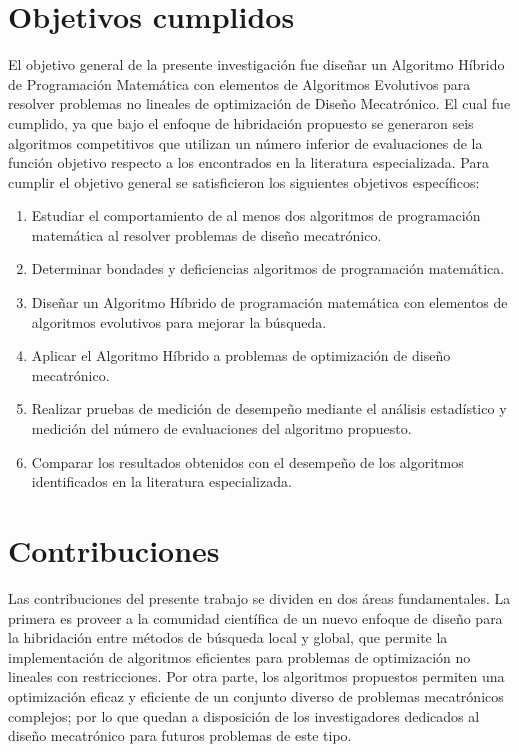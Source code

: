 	 \section{Objetivos cumplidos}
	  El objetivo general de la presente investigación fue diseñar un Algoritmo Híbrido de Programación Matemática con elementos de Algoritmos Evolutivos  para resolver problemas no lineales de optimización de  Diseño Mecatrónico. El cual fue cumplido, ya que bajo el enfoque de hibridación propuesto se generaron seis algoritmos competitivos que utilizan un número inferior de evaluaciones de la función objetivo respecto a los encontrados en la literatura especializada. Para cumplir el objetivo general se satisficieron los siguientes objetivos específicos:
	 \begin{enumerate}
	 	\item	Estudiar el comportamiento de al menos dos algoritmos de programación matemática al resolver problemas de diseño mecatrónico.
	 	\item	Determinar bondades y deficiencias algoritmos de programación matemática.
	 	\item	Diseñar un Algoritmo Híbrido de programación matemática con elementos de algoritmos evolutivos para mejorar la búsqueda.
	 	\item	Aplicar el Algoritmo Híbrido a problemas de optimización de diseño mecatrónico.
	 	\item	Realizar pruebas de medición de desempeño mediante el análisis estadístico y medición del número de evaluaciones del algoritmo propuesto.
	 	\item	Comparar los resultados obtenidos con el desempeño de los algoritmos identificados en la literatura especializada.
	 \end{enumerate}
	 
 \section{Contribuciones}
 Las contribuciones del presente trabajo se dividen en dos áreas fundamentales. La primera es proveer a la comunidad científica de un nuevo enfoque de diseño para la hibridación entre métodos de búsqueda local y global, que permite la implementación de algoritmos eficientes para problemas de optimización no lineales con restricciones. Por otra parte, los algoritmos propuestos permiten una optimización eficaz y eficiente de un conjunto diverso de problemas mecatrónicos complejos; por lo que quedan a disposición de los investigadores dedicados al diseño mecatrónico para futuros problemas de este tipo. 
